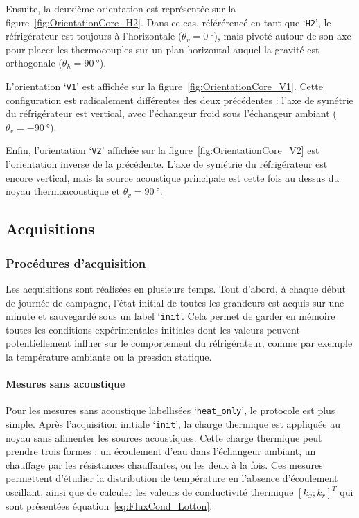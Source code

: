 Ensuite, la deuxième orientation est représentée sur la figure~\ref{fig:OrientationCore_H2}. Dans ce cas, référérencé en tant que `\texttt{H2}', le réfrigérateur est toujours à l'horizontale ($\theta_v=\qty{0}{\degree}$), mais pivoté autour de son axe pour placer les thermocouples sur un plan horizontal auquel la gravité est orthogonale ($\theta_h=\qty{90}{\degree}$).
\smallskip

L'orientation `\texttt{V1}' est affichée sur la figure~\ref{fig:OrientationCore_V1}. Cette configuration est radicalement différentes des deux précédentes : l'axe de symétrie du réfrigérateur est vertical, avec l'échangeur froid sous l'échangeur ambiant ($\theta_v=\qty{-90}{\degree}$).

Enfin, l'orientation `\texttt{V2}' affichée sur la figure~\ref{fig:OrientationCore_V2} est l'orientation inverse de la précédente. L'axe de symétrie du réfrigérateur est encore vertical, mais la source acoustique principale est cette fois au dessus du noyau thermoacoustique et $\theta_v=\qty{+90}{\degree}$.

\subsection{Acquisitions}
\subsubsection{Procédures d'acquisition}
Les acquisitions sont réalisées en plusieurs temps. Tout d'abord, à chaque début de journée de campagne, l'état initial de toutes les grandeurs est acquis sur une minute et sauvegardé sous un label `\texttt{init}'. Cela permet de garder en mémoire toutes les conditions expérimentales initiales dont les valeurs peuvent potentiellement influer sur le comportement du réfrigérateur, comme par exemple la température ambiante ou la pression statique. 

\paragraph{Mesures sans acoustique}
Pour les mesures sans acoustique labellisées `\texttt{heat\_{}only}', le protocole est plus simple. Après l'acquisition initiale `\texttt{init}', la charge thermique est appliquée au noyau sans alimenter les sources acoustiques. Cette charge thermique peut prendre trois formes : un écoulement d'eau dans l'échangeur ambiant, un chauffage par les résistances chauffantes, ou les deux à la fois. Ces mesures permettent d'étudier la distribution de température en l'absence d'écoulement oscillant, ainsi que de calculer les valeurs de conductivité thermique $[k_x;k_r]^T$ qui sont présentées équation~\eqref{eq:FluxCond_Lotton}.

